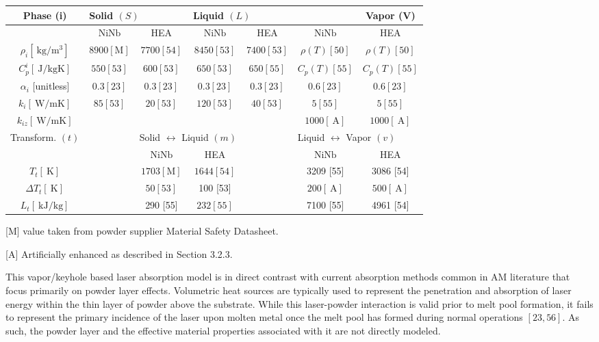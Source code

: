 \documentclass[10pt]{article}
\begin{document}
\begin{center}
\begin{tabular}{|c|c|c|c|c|c|c|}
\hline
\multirow[t]{2}{*}{Phase (i)} & \multicolumn{2}{|l|}{Solid $(S)$} & \multicolumn{2}{|l|}{Liquid $(L)$} &  & Vapor (V) \\
\hline
 & $\mathrm{NiNb}$ & HEA & $\mathrm{NiNb}$ & HEA & $\mathrm{NiNb}$ & HEA \\
\hline
$\rho_{i}\left[\mathrm{~kg} / \mathrm{m}^{3}\right]$ & $8900[\mathrm{M}]$ & $7700[54]$ & $8450[53]$ & $7400[53]$ & $\rho(T)[50]$ & $\rho(T)[50]$ \\
\hline
$C_{p}^{i}[\mathrm{~J} / \mathrm{kgK}]$ & $550[53]$ & $600[53]$ & $650[53]$ & $650[55]$ & $C_{p}(T)[55]$ & $C_{p}(T)[55]$ \\
\hline
$\alpha_{i}$ [unitless] & $0.3[23]$ & $0.3[23]$ & $0.3[23]$ & $0.3[23]$ & $0.6[23]$ & $0.6[23]$ \\
\hline
$k_{i}[\mathrm{~W} / \mathrm{mK}]$ & $85[53]$ & $20[53]$ & $120[53]$ & $40[53]$ & $5[55]$ & $5[55]$ \\
\hline
$k_{i z}[\mathrm{~W} / \mathrm{mK}]$ &  &  &  &  & $1000[\mathrm{~A}]$ & $1000[\mathrm{~A}]$ \\
\hline
\multirow[t]{2}{*}{Transform. $(t)$} &  & \multicolumn{2}{|l|}{Solid $\leftrightarrow$ Liquid $(m)$} &  & \multicolumn{2}{|l|}{Liquid $\leftrightarrow$ Vapor $(v)$} \\
\hline
 &  & $\mathrm{NiNb}$ & HEA &  & $\mathrm{NiNb}$ & HEA \\
\hline
$T_{t}[\mathrm{~K}]$ &  & $1703[\mathrm{M}]$ & $1644[54]$ &  & 3209 [55] & 3086 [54] \\
\hline
$\Delta T_{t}[\mathrm{~K}]$ &  & $50[53]$ & 100 [53] &  & $200[\mathrm{~A}]$ & $500[\mathrm{~A}]$ \\
\hline
$L_{t}[\mathrm{~kJ} / \mathrm{kg}]$ &  & 290 [55] & $232[55]$ &  & 7100 [55] & 4961 [54] \\
\hline
\end{tabular}
\end{center}

[M] value taken from powder supplier Material Safety Datasheet.

[A] Artificially enhanced as described in Section 3.2.3.

This vapor/keyhole based laser absorption model is in direct contrast with current absorption methods common in AM literature that focus primarily on powder layer effects. Volumetric heat sources are typically used to represent the penetration and absorption of laser energy within the thin layer of powder above the substrate. While this laser-powder interaction is valid prior to melt pool formation, it fails to represent the primary incidence of the laser upon molten metal once the melt pool has formed during normal operations $[23,56]$. As such, the powder layer and the effective material properties associated with it are not directly modeled.
\end{document}
